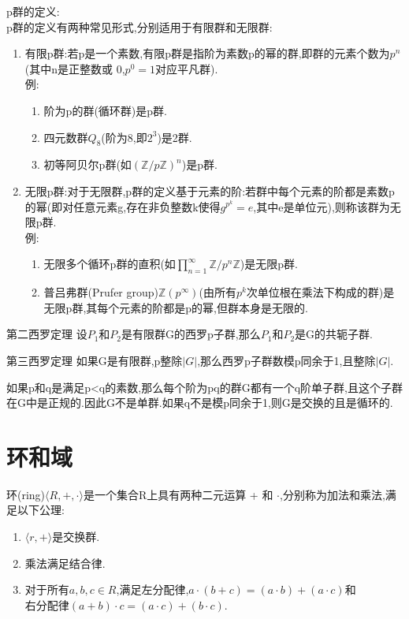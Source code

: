 \documentclass[oneside,openany]{ctexbook}
\begin{document}
p群的定义:\\
p群的定义有两种常见形式,分别适用于有限群和无限群:
\begin{enumerate}
  \item 有限p群:若p是一个素数,有限p群是指阶为素数p的幂的群,即群的元素个数为$p^n$(其中n是正整数或 0,$p^0 = 1$对应平凡群).\\
  例:
  \begin{enumerate}
    \item 阶为p的群(循环群)是p群.
    \item 四元数群$Q_8$(阶为8,即$2^3$)是2群.
    \item 初等阿贝尔p群(如$(\mathbb{Z}/p\mathbb{Z})^n$)是p群.
  \end{enumerate}
  \item 无限p群:对于无限群,p群的定义基于元素的阶:若群中每个元素的阶都是素数p的幂(即对任意元素g,存在非负整数k使得$g^{p^k}=e$,其中e是单位元),则称该群为无限p群.\\
  例:
    \begin{enumerate}
    \item 无限多个循环p群的直积(如$\prod_{n=1}^{\infty} \mathbb{Z}/p^n\mathbb{Z}$)是无限p群.
    \item 普吕弗群(Prufer group)$\mathbb{Z}(p^\infty)$(由所有$p^k$次单位根在乘法下构成的群)是无限p群,其每个元素的阶都是p的幂,但群本身是无限的.
  \end{enumerate}
\end{enumerate}

\begin{definition}{第二西罗定理}{}
设$P_1$和$P_2$是有限群G的西罗p子群,那么$P_1$和$P_2$是G的共轭子群.
\end{definition}

\begin{definition}{第三西罗定理}{}
如果G是有限群,p整除$|G|$,那么西罗p子群数模p同余于1,且整除$|G|$.
\end{definition}

\begin{definition}{}{}
如果p和q是满足p<q的素数,那么每个阶为pq的群G都有一个q阶单子群,且这个子群在G中是正规的.因此G不是单群.如果q不是模p同余于1,则G是交换的且是循环的.
\end{definition}

\chapter{环和域}

\begin{definition}{}{}
环\textnormal{(ring)}$\langle R, +, \cdot\rangle$是一个集合R上具有两种二元运算 + 和 $\cdot$,分别称为加法和乘法,满足以下公理:
\begin{enumerate}
  \item $\langle r,+\rangle$是交换群.
  \item 乘法满足结合律.
  \item 对于所有$a,b,c\in R$,满足左分配律,$a\cdot (b+c)=(a\cdot b)+(a\cdot c)$和\\
  右分配律$(a+b)\cdot c=(a\cdot c)+(b\cdot c)$.
\end{enumerate}
\end{definition}
\end{document}
